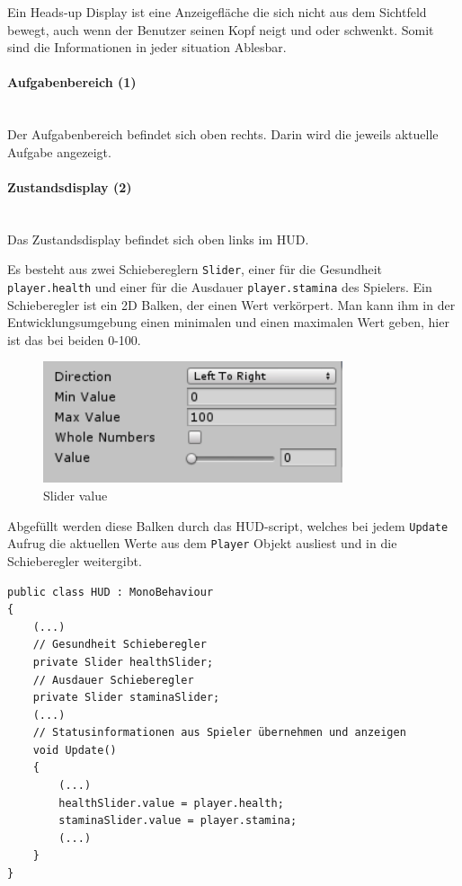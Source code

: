 Ein Heads-up Display ist eine Anzeigefläche die sich nicht aus dem Sichtfeld bewegt, auch wenn der Benutzer seinen Kopf neigt und oder schwenkt.
Somit sind die Informationen in jeder situation Ablesbar.
 
\paragraph{Aufgabenbereich (1)}\mbox{} \\
Der Aufgabenbereich befindet sich oben rechts.
Darin wird die jeweils aktuelle Aufgabe angezeigt.

\paragraph{Zustandsdisplay (2)}\mbox{} \\
Das Zustandsdisplay befindet sich oben links im HUD.

Es besteht aus zwei Schiebereglern \lstinline{Slider}, einer für die Gesundheit \lstinline{player.health} und einer für die Ausdauer \lstinline{player.stamina} des Spielers.
Ein Schieberegler ist ein 2D Balken, der einen Wert verkörpert. Man kann ihm in der Entwicklungsumgebung einen minimalen und einen maximalen Wert geben, hier ist das bei beiden 0-100.

\begin{figure}[H]
\includegraphics[scale=1]{screenshots/nullhundert.png}
\caption{Slider value}
\end{figure}

Abgefüllt werden diese Balken durch das HUD-script, welches bei jedem \lstinline{Update} Aufrug die aktuellen Werte aus dem \lstinline{Player} Objekt ausliest und in die Schieberegler weitergibt.

\begin{lstlisting}[caption={Schieberegler erstellen}]
public class HUD : MonoBehaviour
{
	(...)
	// Gesundheit Schieberegler
	private Slider healthSlider;
	// Ausdauer Schieberegler
	private Slider staminaSlider;
	(...)
	// Statusinformationen aus Spieler übernehmen und anzeigen
	void Update()
	{
		(...)
		healthSlider.value = player.health;
		staminaSlider.value = player.stamina;
		(...)
	}
}
\end{lstlisting}

